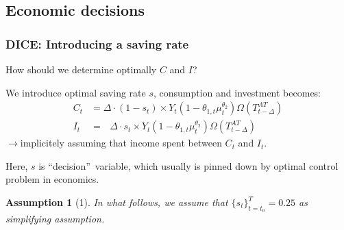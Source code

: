 \documentclass[xcolor=x11names,compress,aspectratio=169]{beamer}%
\makeatletter
\newtheorem{assumption}[theorem]{Assumption}
\renewenvironment{itemize}{\begin{compactitemize}[<+-| alert@+>]}{\end{compactitemize}}
\makeatother
\begin{document}
\subsection{Economic decisions}%

\begin{frame}%
%

\frametitle{DICE: Introducing a saving rate}%


\begin{itemize}
\item How should we determine optimally $C$ and $I$?%
\vspace{1ex}%


\item We introduce optimal saving rate $s$, consumption and investment
becomes:%
\begin{align}
C_{t} &  =\Delta\cdot\left(  1-s_{t}\right)  \times Y_{t}\left(
1-\theta_{1,t}\mu_{t}^{\theta_{2}}\right)  \Omega\left(  T_{t-\Delta}%
^{AT}\right)  \\
I_{t} &  =\text{ \ \ \ \ \ \ \ \ \ }\Delta\cdot s_{t}\times Y_{t}\left(
1-\theta_{1,t}\mu_{t}^{\theta_{2}}\right)  \Omega\left(  T_{t-\Delta}%
^{AT}\right)
\end{align}
$\rightarrow$implicitely assuming that income spent between $C_{t}$ and
$I_{t}$.%
\vspace{1ex}%


\item Here, $s$ is \textquotedblleft decision\textquotedblright\ variable,
which usually is pinned down by optimal control problem in economics.%
\vspace{1ex}%

\end{itemize}

\begin{assumption}
[1]In what follows, we assume that $\{s_{t}\}_{t=t_{0}}^{T}=0.25$ as
simplifying assumption.
\end{assumption}

%

\transboxout
\end{frame}%
%
\end{document}
